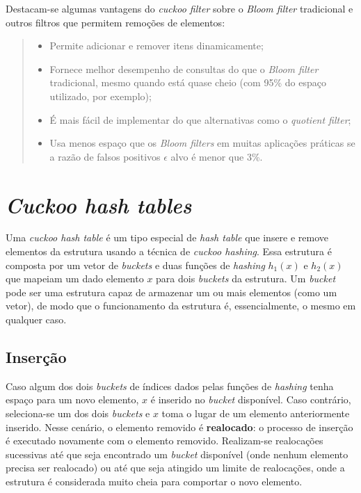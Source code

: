 \documentclass[12pt,twoside,english,brazilian]{book}
\begin{document}
Destacam-se algumas vantagens do \textit{cuckoo filter} sobre o \textit{Bloom filter} tradicional e outros filtros que permitem remoções de elementos:

\begin{quote}
    \begin{itemize}
        \item Permite adicionar e remover itens dinamicamente;
        \item Fornece melhor desempenho de consultas do que o \textit{Bloom filter} tradicional, mesmo quando está quase cheio (com 95\% do espaço utilizado, por exemplo);
        \item É mais fácil de implementar do que alternativas como o \textit{quotient filter};
        \item Usa menos espaço que os \textit{Bloom filters} em muitas aplicações práticas se a razão de falsos positivos $\epsilon$ alvo é menor que 3\%. \citep[tradução nossa]{cuckoo}
    \end{itemize}
\end{quote}

\section{\textit{Cuckoo hash tables}}

Uma \textit{cuckoo hash table} é um tipo especial de \textit{hash table} que insere e remove elementos da estrutura usando a técnica de \textit{cuckoo hashing}. Essa estrutura é composta por um vetor de \textit{buckets} e duas funções de \textit{hashing} $h_1(x)$ e $h_2(x)$ que mapeiam um dado elemento $x$ para dois \textit{buckets} da estrutura. Um \textit{bucket} pode ser uma estrutura capaz de armazenar um ou mais elementos (como um vetor), de modo que o funcionamento da estrutura é, essencialmente, o mesmo em qualquer caso.

\subsection{Inserção}

Caso algum dos dois \textit{buckets} de índices dados pelas funções de \textit{hashing} tenha espaço para um novo elemento, $x$ é inserido no \textit{bucket} disponível. Caso contrário, seleciona-se um dos dois \textit{buckets} e $x$ toma o lugar de um elemento anteriormente inserido. Nesse cenário, o elemento removido é \textbf{realocado}: o processo de inserção é executado novamente com o elemento removido. Realizam-se realocações sucessivas até que seja encontrado um \textit{bucket} disponível (onde nenhum elemento precisa ser realocado) ou até que seja atingido um limite de realocações, onde a estrutura é considerada muito cheia para comportar o novo elemento.
\end{document}
